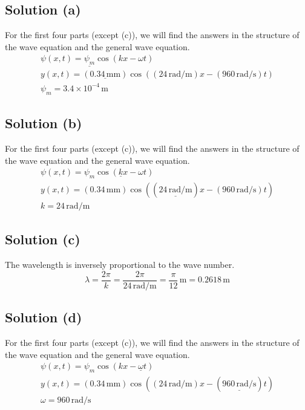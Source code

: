 \documentclass[12pt]{article}
\newcommand{\E}[1]{\times 10^{#1}}
\begin{document}
        \subsection{Solution (a)}
            For the first four parts (except (c)), we will find the answers in the structure of the wave equation and the general wave equation.
            \begin{gather}
                \psi (x,t)  =   \underline{\psi_m} \cos(k x - \omega t)\\
                y(x,t)  =   (\underline{0.34\,\unit{\milli\meter}}) \cos((24\,\unit{\radian/\meter})x - (960\,\unit{\radian/\second})t)\\
                \boxed{\psi_m   =   3.4\E{-4}\,\unit{\meter}}
            \end{gather}
        
        \subsection{Solution (b)}
            For the first four parts (except (c)), we will find the answers in the structure of the wave equation and the general wave equation.
            \begin{gather}
                \psi (x,t)  =   \psi_m \cos(\underline{k} x - \omega t)\\
                y(x,t)  =   (0.34\,\unit{\milli\meter}) \cos((\underline{24\,\unit{\radian/\meter}})x - (960\,\unit{\radian/\second})t)\\
                \boxed{k   =   24\,\unit{\radian/\meter}}
            \end{gather}

        \subsection{Solution (c)}
            The wavelength is inversely proportional to the wave number.
            \begin{equation}
                \lambda =   \frac{2\pi}{k}
                    =   \frac{2\pi}{24\,\unit{\radian/\meter}}
                    =   \frac{\pi}{12}\,\unit{\meter}
                    =   \boxed{0.2618\,\unit{\meter}}
            \end{equation}
        
        \subsection{Solution (d)}
            For the first four parts (except (c)), we will find the answers in the structure of the wave equation and the general wave equation.
            \begin{gather}
                \psi (x,t)  =   \psi_m \cos(k x - \underline{\omega} t)\\
                y(x,t)  =   (0.34\,\unit{\milli\meter}) \cos((24\,\unit{\radian/\meter})x - (\underline{960\,\unit{\radian/\second}})t)\\
                \boxed{\omega   =   960\,\unit{\radian/\second}}
            \end{gather}
\end{document}
